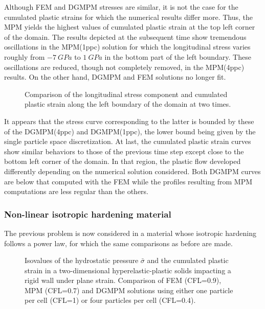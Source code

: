 Although FEM and DGMPM stresses are similar, it is not the case for the cumulated plastic strains for which the numerical results differ more.
Thus, the MPM yields the highest values of cumulated plastic strain at the top left corner of the domain.
The results depicted at the subsequent time show tremendous oscillations in the MPM(1ppc) solution for which the longitudinal stress varies roughly from $-7 \: GPa$ to $1 \: GPa$ in the bottom part of the left boundary.
These oscillations are reduced, though not completely removed, in the MPM(4ppc) results. 
On the other hand, DGMPM and FEM solutions no longer fit.
\begin{figure}[h!]
  \centering
  {}
  {}
  
  \caption{Comparison of the longitudinal stress component and cumulated plastic strain along the left boundary of the domain at two times.}
  \label{fig:left_line}
\end{figure}
It appears that the stress curve corresponding to the latter is bounded by these of the DGMPM(4ppc) and DGMPM(1ppc), the lower bound being given by the single particle space discretization.
At last, the cumulated plastic strain curves show similar behaviors to those of the previous time step except close to the bottom left corner of the domain.
In that region, the plastic flow developed differently depending on the numerical solution considered.
Both DGMPM curves are below that computed with the FEM while the profiles resulting from MPM computations are less regular than the others.

\subsubsection{Non-linear isotropic hardening material}
\label{sec:non-linear-hardening}
The previous problem is now considered in a material whose isotropic hardening follows a power law, for which the same comparisons as before are made. 

\begin{figure}[h!]
  \centering
  \caption{Isovalues of the hydrostatic pressure $\bar{\sigma}$ and the cumulated plastic strain in a two-dimensional hyperelastic-plastic solids impacting a rigid wall under plane strain. Comparison of FEM (CFL=0.9), MPM (CFL=0.7) and DGMPM solutions using either one particle per cell (CFL=1) or four particles per cell (CFL=0.4).}
  \label{fig:PS_taylor_NL}
\end{figure}

